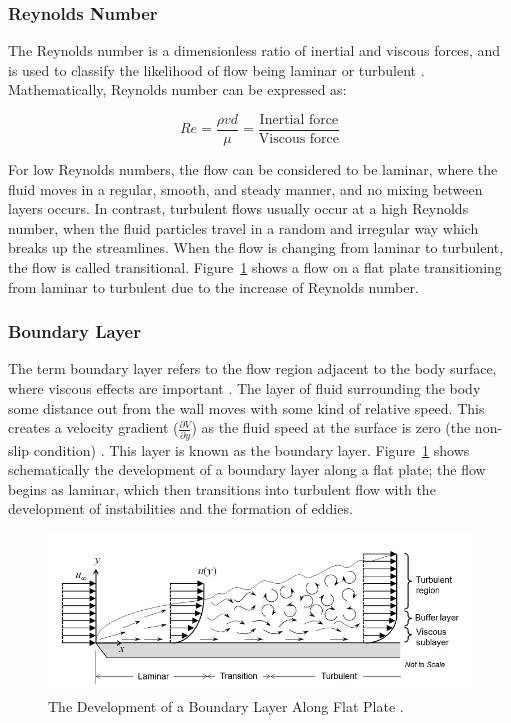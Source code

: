 \subsubsection{Reynolds Number}
The Reynolds number is a dimensionless ratio of inertial and viscous forces, and is used to classify the likelihood of flow being laminar or turbulent \cite{Rehm2008SituationalMPD}. Mathematically, Reynolds number can be expressed as:

\begin{equation}
Re = \frac{\rho v d}{\mu} = \frac{\text{Inertial force}}{\text{Viscous force}}
\end{equation}

\noindent For low Reynolds numbers, the flow can be considered to be laminar, where the fluid moves in a regular, smooth, and steady manner, and no mixing between layers occurs\cite{Obidi2014TheoryVehicles}. In contrast, turbulent flows usually occur at a high Reynolds number, when the fluid particles travel in a random and irregular way which breaks up the streamlines. When the flow is changing from laminar to turbulent, the flow is called transitional. Figure~\ref{fig:3} shows a flow on a flat plate transitioning from laminar to turbulent  due to the increase of Reynolds number.

\subsubsection{Boundary Layer}
The term boundary layer refers to the flow region adjacent to the body surface, where viscous effects are important \cite{Anderson2010FundamentalsAerodynamics}. The layer of fluid surrounding the body some distance out from the wall moves with some kind of relative speed. This creates a velocity gradient ($\frac{\partial V}{\partial y}$) as the fluid speed at the surface is zero (the non-slip condition)  \cite{Scibor-Rylski1984RoadAerodynamics}. This layer is known as the boundary layer. Figure~\ref{fig:3} shows schematically the development of a boundary layer along a flat plate; the flow begins as laminar, which then transitions into turbulent flow with the development of instabilities and the formation of eddies.

\begin{figure}[!htb]
    \centering
    \includegraphics[scale=0.7]{Figures/BL_laminar_turbulent.png}
    \caption{The Development of a Boundary Layer Along Flat Plate \cite{Frei2017WhichApplication}.}
    \label{fig:3}
\end{figure}

